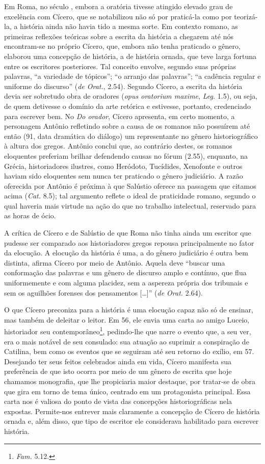 Em Roma, no século , embora a oratória tivesse atingido elevado grau de
excelência com Cícero, que se notabilizou não só por praticá-la como por
teorizá-la, a história ainda não havia tido a mesma sorte. Em contexto romano,
as primeiras reflexões teóricas sobre a escrita da história a chegarem até nós
encontram-se no próprio Cícero, que, embora não tenha praticado o gênero,
elaborou uma concepção de história, a de história ornada, que teve larga
fortuna entre os escritores posteriores. Tal conceito envolve, segundo suas
próprias palavras, “a variedade de tópicos”; “o arranjo das palavras”; “a
cadência regular e uniforme do discurso” (\emph{de Orat.}, 2.54). Segundo
Cícero, a escrita da história devia ser sobretudo obra de oradores (\emph{opus
oratorium maxime}, \emph{Leg.} 1.5), ou seja, de quem detivesse o domínio
da arte retórica e estivesse, portanto, credenciado para escrever bem.  No \emph{Do
orador}, Cícero apresenta, em certo momento, a personagem Antônio refletindo
sobre a causa de os romanos não possuírem até então (91, data dramática
do diálogo) um representante no gênero historiográfico à altura dos gregos.
Antônio conclui que, ao contrário destes, os romanos eloquentes preferiam
brilhar defendendo causas no fórum (2.55), enquanto, na Grécia, historiadores
ilustres, como Heródoto, Tucídides, Xenofonte e outros haviam sido  eloquentes
sem nunca ter praticado o gênero judiciário.  A razão oferecida por Antônio é
próxima à que Salústio oferece na passagem que citamos acima (\emph{Cat.} 8.5);  tal argumento reflete o ideal de praticidade romano, segundo o qual
haveria mais virtude na ação do que no trabalho intelectual, reservado para as
horas de ócio.  

 A crítica de Cícero e de Salústio de que Roma não tinha ainda um escritor que
 pudesse ser comparado aos historiadores gregos repousa principalmente no fator
 da elocução. A elocução da história é uma, a do gênero judiciário é outra bem
 distinta, afirma Cícero por meio de Antônio. Aquela deve ``buscar uma conformação das palavras e um gênero de discurso amplo e contínuo, que flua uniformemente e com alguma placidez, sem a aspereza própria dos tribunais e sem os aguilhões forenses dos pensamentos  [\ldots]” (\emph{de Orat.} 2.64). 
 
O que Cícero preconiza para a história é uma elocução capaz não só de ensinar,
mas também de deleitar o leitor. Em 56, ele envia uma carta ao amigo Luceio,
historiador seu contemporâneo\footnote{ \emph{Fam.} 5.12.}, pedindo-lhe que
narre o evento que, a seu ver, era o mais notável de seu consulado: sua atuação
ao suprimir a conspiração de Catilina, bem como os eventos que se seguiram até
seu retorno do exílio, em 57. Desejando ter seus feitos celebrados ainda em
vida, Cícero manifesta sua preferência de que isto ocorra por meio de um gênero
de escrita que hoje chamamos monografia, que lhe propiciaria maior destaque,
por tratar-se de obra que gira em torno de tema único, centrado em um
protagonista principal. Essa carta nos é valiosa do ponto de vista das
concepções historiográficas nela expostas. Permite-nos entrever mais claramente
a concepção de Cícero de história ornada e, além disso, que tipo de escritor
ele considerava habilitado para escrever história. 

